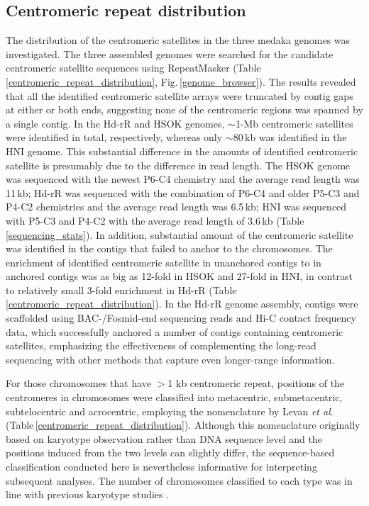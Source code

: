 \subsection*{Centromeric repeat distribution}
  The distribution of the centromeric satellites in the three medaka genomes was investigated. The three assembled genomes were searched for the candidate centromeric satellite sequences using RepeatMasker (Table\,\ref{centromeric_repeat_distribution}, Fig.\,\ref{genome_browser}). The results revealed that all the identified centromeric satellite arrays were truncated by contig gaps at either or both ends, suggesting none of the centromeric regions was spanned by a single contig. In the Hd-rR and HSOK genomes, $\sim$1-Mb centromeric satellites were identified in total, respectively, whereas only $\sim$80\,kb was identified in the HNI genome. This substantial difference in the amounts of identified centromeric satellite is presumably due to the difference in read length. The HSOK genome was sequenced with the newest P6-C4 chemistry and the average read length was 11\,kb; Hd-rR was sequenced with the combination of P6-C4 and older P5-C3 and P4-C2 chemistries and the average read length was 6.5\,kb; HNI was sequenced with P5-C3 and P4-C2 with the average read length of 3.6\,kb (Table\,\ref{sequencing_stats}). In addition, substantial amount of the centromeric satellite was identified in the contigs that failed to anchor to the chromosomes. The enrichment of identified centromeric satellite in unanchored contigs to in anchored contigs was as big as 12-fold in HSOK and 27-fold in HNI, in contrast to relatively small 3-fold enrichment in Hd-rR (Table\,\ref{centromeric_repeat_distribution}). In the Hd-rR genome assembly, contigs were scaffolded using BAC-/Fosmid-end sequencing reads and Hi-C contact frequency data, which successfully anchored a number of contigs containing centromeric satellites, emphasizing the effectiveness of complementing the long-read sequencing with other methods that capture even longer-range information.


  For those chromosomes that have $>$1 kb centromeric repeat, positions of the centromeres in chromosomes were classified into metacentric, submetacentric, subtelocentric and acrocentric, employing the nomenclature by Levan \textit{et al}. \cite{levan1964} (Table\,\ref{centromeric_repeat_distribution}). Although this nomenclature originally based on karyotype observation rather than DNA sequence level and the positions induced from the two levels can slightly differ, the sequence-based classification conducted here is  nevertheless informative for interpreting subsequent analyses. The number of chromosomes classified to each type was in line with previous karyotype studies \cite{}.

